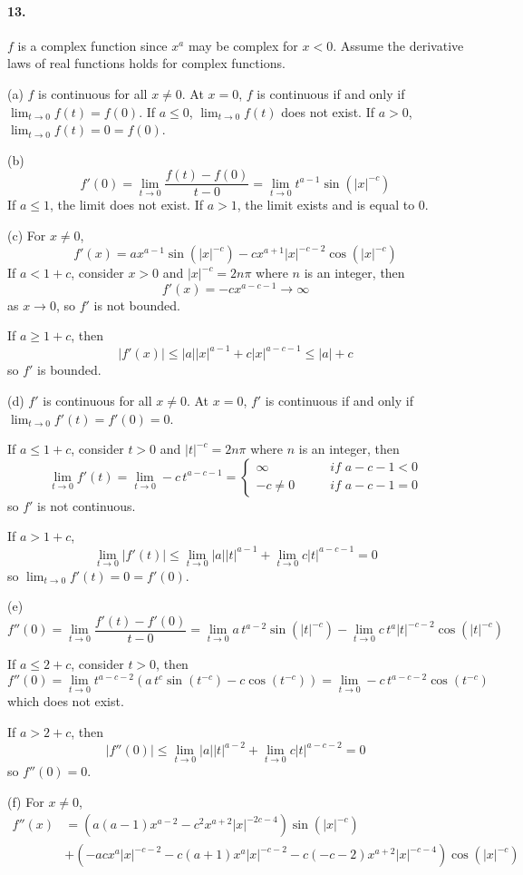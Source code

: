 \documentclass[a4paper]{article}
\begin{document}
\paragraph{13.}
$f$ is a complex function since $x^a$ may be complex for $x<0$. Assume the derivative laws of real functions holds for complex functions.
\medskip

(a)
$f$ is continuous for all $x\neq0$. At $x=0$,\; $f$ is continuous if and only if $\lim_{t\to0}f(t)=f(0)$. If $a\leq0$,\; $\lim_{t\to0}f(t)$ does not exist. If $a>0$,\; $\lim_{t\to0}f(t)=0=f(0)$.
\medskip

(b)
\[
f'(0)=\lim_{t\to0}\frac{f(t)-f(0)}{t-0}=\lim_{t\to0}t^{a-1}\sin(|x|^{-c})
\]
If $a\leq1$, the limit does not exist. If $a>1$, the limit exists and is equal to $0$.
\medskip

(c)
For $x\neq0$,
\[
f'(x)=ax^{a-1}\sin(|x|^{-c})-cx^{a+1}|x|^{-c-2}\cos(|x|^{-c})
\]
If $a<1+c$, consider $x>0$ and $|x|^{-c}=2n\pi$ where $n$ is an integer, then
\[
f'(x)=-cx^{a-c-1}\to\infty
\]
as $x\to0$, so $f'$ is not bounded.

If $a\geq 1+c$, then
\[
|f'(x)|\leq|a||x|^{a-1}+c|x|^{a-c-1}\leq |a|+c
\]
so $f'$ is bounded.
\medskip

(d)
$f'$ is continuous for all $x\neq0$. At $x=0$,\; $f'$ is continuous if and only if $\lim_{t\to0}f'(t)=f'(0)=0$.

If $a\leq 1+c$, consider $t>0$ and $|t|^{-c}=2n\pi$ where $n$ is an integer, then
\[
\lim_{t\to0}f'(t)=\lim_{t\to0}-c\,t^{a-c-1}=
\begin{cases}
\infty\qquad & \textit{if $a-c-1<0$}\\
-c\neq0\qquad & \textit{if $a-c-1=0$}
\end{cases}
\]
so $f'$ is not continuous.

If $a>1+c$, 
\[
\lim_{t\to0}|f'(t)|\leq \lim_{t\to0}|a||t|^{a-1}+\lim_{t\to0}c|t|^{a-c-1}=0
\]
so $\lim_{t\to0}f'(t)=0=f'(0)$.
\medskip

(e)
\[
f''(0)=\lim_{t\to0}\frac{f'(t)-f'(0)}{t-0}=\lim_{t\to0}a\,t^{a-2}\sin(|t|^{-c})-\lim_{t\to0}c\,t^{a}|t|^{-c-2}\cos(|t|^{-c})
\]

If $a\leq 2+c$, consider $t>0$, then
\[
f''(0)=\lim_{t\to0}t^{a-c-2}\left(a\,t^c\sin(t^{-c})-c\cos(t^{-c}) \right)=\lim_{t\to0}-c\,t^{a-c-2}\cos(t^{-c})
\]
which does not exist.

If $a>2+c$, then
\[
|f''(0)|\leq \lim_{t\to0}|a||t|^{a-2}+\lim_{t\to0}c|t|^{a-c-2}=0
\]
so $f''(0)=0$.
\medskip

(f)
For $x\neq0$,
\begin{equation*}
    \begin{split}
      f''(x) & =\left(a(a-1)x^{a-2}-c^2x^{a+2}|x|^{-2c-4} \right)\sin(|x|^{-c})\\  
      & +\left(-acx^a|x|^{-c-2}-c(a+1)x^a|x|^{-c-2}-c(-c-2)x^{a+2}|x|^{-c-4} \right)\cos(|x|^{-c})
    \end{split}
\end{equation*}
\end{document}
